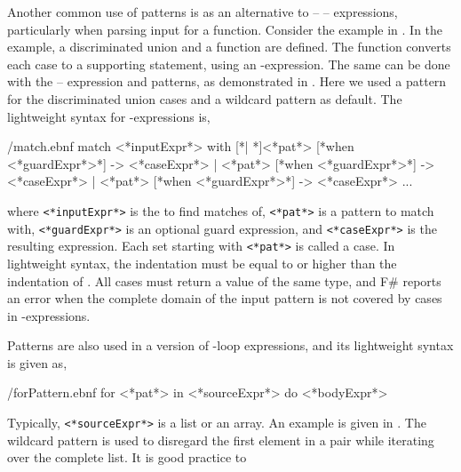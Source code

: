 \documentclass[springer.tex]{subfiles}
\begin{document}
Another common use of patterns is as an alternative to  --  --  expressions, particularly when parsing input for a function. Consider the example in .
%
%
In the example, a discriminated union and a function are defined. The function converts each case to a supporting statement, using an -expression. The same can be done with the  --  expression and patterns, as demonstrated in .
%
%
Here we used a pattern for the discriminated union cases and a wildcard pattern as default. The lightweight syntax for -expressions is,
%
\begin{verbatimwrite}{\ebnf/match.ebnf}
match <*inputExpr*> with 
 [*| *]<*pat*> [*when <*guardExpr*>*] -> <*caseExpr*> 
 | <*pat*> [*when <*guardExpr*>*] -> <*caseExpr*> 
 | <*pat*> [*when <*guardExpr*>*] -> <*caseExpr*> 
 ...
\end{verbatimwrite}
%
where \lstinline[language=syntax]{<*inputExpr*>} is the  to find matches of, \lstinline[language=syntax]{<*pat*>} is a pattern to match with, \lstinline[language=syntax]{<*guardExpr*>} is an optional guard expression, and \lstinline[language=syntax]{<*caseExpr*>} is the resulting expression. Each set starting with \lstinline[language=syntax]{<*pat*>} is called a case.  In lightweight syntax, the indentation must be equal to or higher than the indentation of . All cases must return a value of the same type, and F\# reports an error when the complete domain of the input pattern is not covered by cases in -expressions.

Patterns are also used in a version of -loop expressions, and its lightweight syntax is given as,
%
\begin{verbatimwrite}{\ebnf/forPattern.ebnf}
for <*pat*> in <*sourceExpr*> do 
  <*bodyExpr*>
 \end{verbatimwrite}
%
Typically, \lstinline[language=syntax]{<*sourceExpr*>} is a list or an array. An example is given in .
%
%
The wildcard pattern is used to disregard the first element in a pair while iterating over the complete list. It is good practice to 
\end{document}
